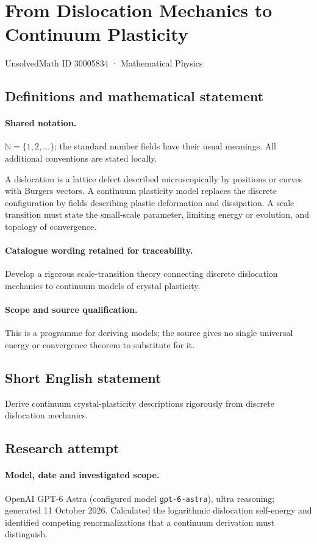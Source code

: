 \documentclass[11pt]{article}
\begin{document}
\setcounter{section}{30005833}
\section{From Dislocation Mechanics to Continuum Plasticity}\label{30005834}
{\small UnsolvedMath ID 30005834 · Mathematical Physics}
\subsection{Definitions and mathematical statement}

\paragraph{Shared notation.}$\mathbb N=\{1,2,\ldots\}$; the standard number fields have their usual meanings. All additional conventions are stated locally.


A dislocation is a lattice defect described microscopically by positions or curves with Burgers vectors. A continuum plasticity model replaces the discrete configuration by fields describing plastic deformation and dissipation. A scale transition must state the small-scale parameter, limiting energy or evolution, and topology of convergence.

\paragraph{Catalogue wording retained for traceability.}
Develop a rigorous scale-transition theory connecting discrete dislocation mechanics to continuum models of crystal plasticity.

\paragraph{Scope and source qualification.}This is a programme for deriving models; the source gives no single universal energy or convergence theorem to substitute for it.
\subsection{Short English statement}
Derive continuum crystal-plasticity descriptions rigorously from discrete dislocation mechanics.
\subsection{Research attempt}
\paragraph{Model, date and investigated scope.}
OpenAI GPT-6 Astra (configured model \texttt{gpt-6-astra}), ultra reasoning; generated 11 October 2026. Calculated the logarithmic dislocation self-energy and identified competing renormalizations that a continuum derivation must distinguish.
\end{document}
